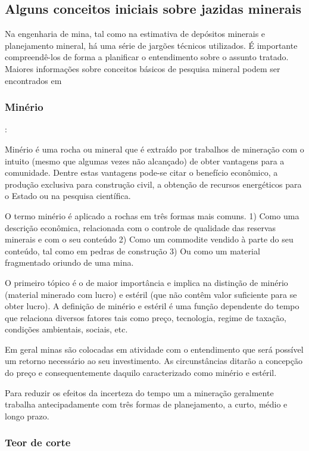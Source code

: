  \subsection{Alguns conceitos iniciais sobre jazidas minerais}
 
 Na engenharia de mina, tal como na estimativa de depósitos minerais e planejamento mineral, há uma série de jargões técnicos utilizados. É importante compreendê-los de forma a planificar o entendimento sobre o assunto tratado. Maiores informações sobre conceitos básicos de pesquisa mineral podem ser encontrados em \cite{sinclair2002applied} 
 
\subsubsection{Minério} : 

Minério é uma rocha ou mineral que é extraído por trabalhos de mineração com o intuito (mesmo que algumas vezes não alcançado) de obter vantagens para a comunidade. Dentre estas vantagens pode-se citar o benefício econômico, a produção exclusiva para construção civil, a obtenção de recursos energéticos para  o Estado ou na pesquisa científica.

O termo minério é aplicado a rochas em três formas mais comuns. 1) Como uma descrição econômica, relacionada com o controle de qualidade das reservas minerais e com o seu conteúdo 2) Como um commodite vendido à parte do seu conteúdo, tal como em pedras de construção 3) Ou como um material fragmentado oriundo de uma mina. 

O primeiro tópico é o de  maior importância e implica na distinção de minério (material minerado com lucro) e estéril (que não contêm valor suficiente para se obter lucro). A definição de minério e estéril é uma função dependente do tempo que relaciona diversos fatores tais como preço, tecnologia, regime de taxação, condições ambientais, sociais, etc. 

Em geral minas são colocadas em atividade com o entendimento que será possível um retorno necessário ao seu investimento. As circunstâncias ditarão a concepção do preço e consequentemente daquilo caracterizado como minério e estéril. 

Para reduzir os efeitos da incerteza do tempo um a mineração geralmente trabalha antecipadamente com três formas de planejamento, a curto, médio e longo prazo. 

\subsubsection{Teor de corte}

